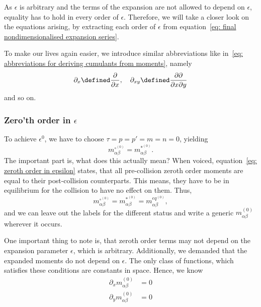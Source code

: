 As $\epsilon$ is arbitrary and the terms of the expansion are not allowed to depend on $\epsilon$, equality has to hold in every order of $\epsilon$.
Therefore, we will take a closer look on the equations arising, by extracting each order of $\epsilon$ from equation~\eqref{eq: final nondimensionalised expansion series}.

To make our lives again easier, we introduce similar abbreviations like in~\eqref{eq: abbreviations for deriving cumulants from moments}, namely
\begin{equation}
  \partial_x \defined \frac{\partial}{\partial x}, \quad
  \partial_{xy} \defined \frac{\partial\partial}{\partial x\partial y}
\end{equation}
and so on.

\subsubsection{Zero'th order in \texorpdfstring{$\epsilon$}{epsilon}}
\label{subs: Zeroth order in epsilon}

To achieve $\epsilon^0$, we have to choose $\tau=p=p'=m=n=0$, yielding
\begin{equation}
  \label{eq: zeroth order in epsilon}
  m_{\alpha\beta}^{\circ^{(0)}} = m_{\alpha\beta}^{*^{(0)}}.
\end{equation}
The important part is, what does this actually mean?
When voiced, equation~\eqref{eq: zeroth order in epsilon} states, that all pre-collision zeroth order moments are equal to their post-collision counterparts.
This means, they have to be in equilibrium for the collision to have no effect on them.
Thus,
\begin{equation}
  \label{eq: zeroth order invariant}
  m_{\alpha\beta}^{\circ^{(0)}} = m_{\alpha\beta}^{*^{(0)}} = m_{\alpha\beta}^{eq^{(0)}},
\end{equation}
and we can leave out the labels for the different status and write a generic $m_{\alpha\beta}^{(0)}$ wherever it occurs.

One important thing to note is, that zeroth order terms may not depend on the expansion parameter $\epsilon$, which is arbitrary.
Additionally, we demanded that the expanded moments do not depend on $\epsilon$.
The only class of functions, which satisfies these conditions are constants in space.
Hence, we know
\begin{equation}
  \label{eq: derivative of zeroth order}
  \begin{aligned}
    \partial_x m_{\alpha\beta}^{(0)} &= 0 \\
    \partial_y m_{\alpha\beta}^{(0)} &= 0
  \end{aligned}
\end{equation}

